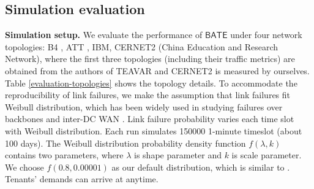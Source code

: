 \documentclass[sigconf]{acmart}
\begin{document}
\subsection{Simulation evaluation}
\textbf{Simulation setup.} 
We evaluate the performance of $\mathsf{BATE}$ under four network topologies: B4 \cite{B4}, ATT \cite{Teavar}, IBM\cite{SMORE}, CERNET2 (China Education and Research Network), where the first three topologies (including their traffic metrics) are obtained from the authors of TEAVAR\cite{Teavar} and CERNET2 is measured by ourselves.
Table \ref{evaluation-topologies} shows the topology details.
To accommodate the reproducibility of link failures, we make the assumption that link failures fit Weibull distribution, which has been widely used in studying failures over backbones \cite{Characterization} and inter-DC WAN \cite{Teavar}.
Link failure probability varies each time slot with Weibull distribution.
Each run simulates 150000  1-minute timeslot (about 100 days).
The Weibull distribution probability density function $f(\lambda,k)$ contains two parameters, where $\lambda$ is shape parameter and $k$ is scale parameter.
We choose $f(0.8,0.00001)$ as our default distribution, which is similar to \cite{Teavar}.
Tenants' demands can arrive at anytime.
\end{document}
